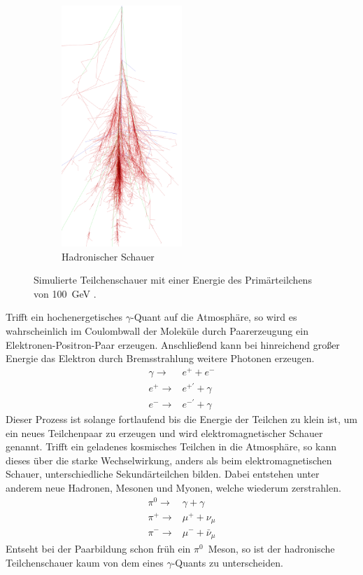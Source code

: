 \begin{figure}[H]
\begin{subfigure}[t]{0.49\textwidth}
	\includegraphics[width=0.5\textwidth]{images/proton_100GeV.png}
	\caption{Hadronischer Schauer}
  \end{subfigure}
  \caption{Simulierte Teilchenschauer mit einer Energie des Primärteilchens von \SI{100}{\giga \electronvolt} \cite{corsika}.}
\end{figure}
Trifft ein hochenergetisches $\gamma$-Quant auf die Atmosphäre, so wird es wahrscheinlich im Coulombwall der Moleküle durch Paarerzeugung ein Elektronen-Positron-Paar erzeugen. 
Anschließend kann bei hinreichend großer Energie das Elektron durch Bremsstrahlung weitere Photonen erzeugen. 
\begin{eqnarray}
  \gamma \rightarrow& e^{+} + e^{-} \\
  e^{+} \rightarrow& e^{+'} + \gamma \\
  e^{-} \rightarrow& e^{-'} + \gamma 
\end{eqnarray}
Dieser Prozess ist solange fortlaufend bis die Energie der Teilchen zu klein ist, um ein neues Teilchenpaar zu erzeugen und wird elektromagnetischer Schauer genannt.
Trifft ein geladenes kosmisches Teilchen in die Atmosphäre, so kann dieses über die starke Wechselwirkung, anders als beim elektromagnetischen Schauer, unterschiedliche Sekundärteilchen bilden. 
Dabei entstehen unter anderem neue Hadronen, Mesonen und Myonen, welche wiederum zerstrahlen. 
\begin{eqnarray}
  \pi^{0} \rightarrow& \gamma + \gamma \\
  \pi^{+} \rightarrow& \mu^{+} + \nu_{\mu} \\
  \pi^{-} \rightarrow& \mu^{-} + \bar{\nu}_{\mu}
\end{eqnarray}
Entseht bei der Paarbildung schon früh ein $\pi^{0}$~Meson, so ist der hadronische Teilchenschauer kaum von dem eines $\gamma$-Quants zu unterscheiden. 

